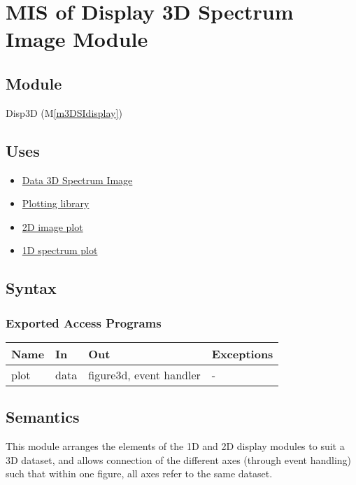 \documentclass[12pt, titlepage]{article}
\newcommand{\mref}[1]{M\ref{#1}}
\begin{document}
\newpage
\section{MIS of Display 3D Spectrum Image Module} \label{Mod:Disp3D}

\subsection{Module}

Disp3D (\mref{m3DSIdisplay})

\subsection{Uses}
\begin{itemize}
    \item \hyperref[Mod:SI]{Data 3D Spectrum Image}
    \item \hyperref[Mod:Plotting]{Plotting library}
    \item \hyperref[Mod:Disp2D]{2D image plot}
    \item \hyperref[Mod:Disp1D]{1D spectrum plot}
\end{itemize}

\subsection{Syntax}

\subsubsection{Exported Access Programs}

\begin{center}
    \begin{tabular}{p{2cm} p{3cm} p{5cm} p{2cm}}
        \hline
        \textbf{Name} & \textbf{In} & \textbf{Out} & \textbf{Exceptions} \\
        \hline
        plot & data & figure3d, event handler & - \\
        \hline
    \end{tabular}
\end{center}

\subsection{Semantics}
This module arranges the elements of the 1D and 2D display modules to suit a 3D
dataset, and allows connection of the different axes (through event handling)
such that within one figure, all axes refer to the same dataset.
\end{document}
